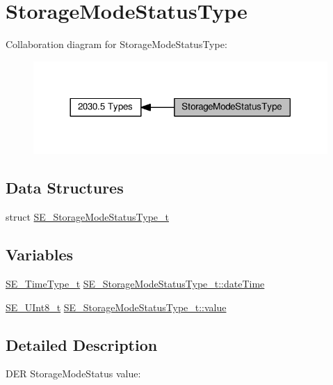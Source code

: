 \hypertarget{group__StorageModeStatusType}{}\section{Storage\+Mode\+Status\+Type}
\label{group__StorageModeStatusType}
Collaboration diagram for Storage\+Mode\+Status\+Type\+:\nopagebreak
\begin{figure}[H]
\begin{center}
\leavevmode
\includegraphics[width=317pt]{group__StorageModeStatusType}
\end{center}
\end{figure}
\subsection*{Data Structures}
\begin{DoxyCompactItemize}
\item 
struct \hyperlink{structSE__StorageModeStatusType__t}{S\+E\+\_\+\+Storage\+Mode\+Status\+Type\+\_\+t}
\end{DoxyCompactItemize}
\subsection*{Variables}
\begin{DoxyCompactItemize}
\item 
\hyperlink{group__TimeType_ga6fba87a5b57829b4ff3f0e7638156682}{S\+E\+\_\+\+Time\+Type\+\_\+t} \hyperlink{group__StorageModeStatusType_ga1dd241e378a43cfe50b357e64ab10f6d}{S\+E\+\_\+\+Storage\+Mode\+Status\+Type\+\_\+t\+::date\+Time}
\item 
\hyperlink{group__UInt8_gaf7c365a1acfe204e3a67c16ed44572f5}{S\+E\+\_\+\+U\+Int8\+\_\+t} \hyperlink{group__StorageModeStatusType_ga16c64971c00e1d804890fb324568bd9a}{S\+E\+\_\+\+Storage\+Mode\+Status\+Type\+\_\+t\+::value}
\end{DoxyCompactItemize}


\subsection{Detailed Description}
D\+ER Storage\+Mode\+Status value\+:

